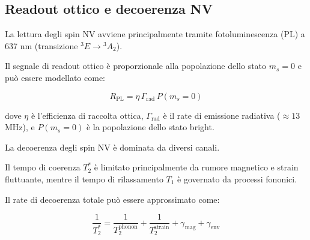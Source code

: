 \documentclass[11pt,a4paper]{article}
\theoremstyle{plain}
\theoremstyle{definition}
\begin{document}
\vspace{0.4cm}

\subsection{Readout ottico e decoerenza NV}

\vspace{0.2cm}

La lettura degli spin NV avviene principalmente tramite fotoluminescenza (PL) a 637 nm (transizione ${}^3E \to {}^3A_2$). 

\vspace{0.3cm}


Il segnale di readout ottico è proporzionale alla popolazione dello stato $m_s = 0$ e può essere modellato come:

\begin{tcolorbox}[colback=blue!5!white, colframe=blue!75!black, title={Rate di readout ottico}]
\begin{equation}
R_{\text{PL}} = \eta \, \Gamma_{\text{rad}} \, P(m_s=0)
\label{eq:readout_pl}
\end{equation}
\end{tcolorbox}

\vspace{0.4cm}

dove $\eta$ è l’efficienza di raccolta ottica, $\Gamma_{\text{rad}}$ è il rate di emissione radiativa ($\approx 13$ MHz), e $P(m_s=0)$ è la popolazione dello stato bright.


\vspace{0.5cm}

La decoerenza degli spin NV è dominata da diversi canali. 



\clearpage



Il tempo di coerenza $T_2^*$ è limitato principalmente da rumore magnetico e strain fluttuante, mentre il tempo di rilassamento $T_1$ è governato da processi fononici. 


\vspace{0.3cm}


Il rate di decoerenza totale può essere approssimato come:

\vspace{0.3cm}


\begin{tcolorbox}[colback=blue!5!white, colframe=blue!75!black, title={Rate di decoerenza NV}]
\begin{equation}
\frac{1}{T_2^*} = \frac{1}{T_2^{\text{phonon}}} + \frac{1}{T_2^{\text{strain}}} + \gamma_{\text{mag}} + \gamma_{\text{env}}
\label{eq:decoherence_nv}
\end{equation}
\end{tcolorbox}
\end{document}
